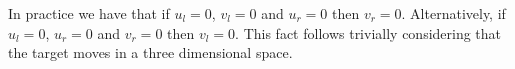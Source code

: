 In practice we have that if $u_l=0$, $v_l=0$ and $u_r=0$ then $v_r=0$. 
Alternatively, if $u_l=0$, $u_r=0$ and $v_r=0$ then $v_l=0$. This fact 
follows trivially considering that the target moves in a three dimensional 
space.